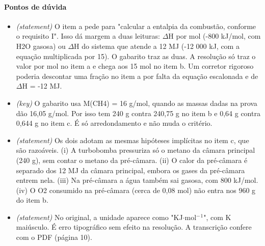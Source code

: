 \documentclass{article}%
\begin{document}
\paragraph{Pontos de dúvida}%
\begin{itemize}%
\item%
\textit{(statement)} O item a pede para "calcular a entalpia da combustão, conforme o requisito I". Isso dá margem a duas leituras: $\Delta$H por mol (-800 kJ/mol, com H2O gasosa) ou $\Delta$H do sistema que atende a 12 MJ (-12 000 kJ, com a equação multiplicada por 15). O gabarito traz as duas. A resolução só traz o valor por mol no item a e chega aos 15 mol no item b. Um corretor rigoroso poderia descontar uma fração no item a por falta da equação escalonada e de $\Delta$H = -12 MJ.%
\item%
\textit{(key)} O gabarito usa M(CH4) = 16 g/mol, quando as massas dadas na prova dão 16,05 g/mol. Por isso tem 240 g contra 240,75 g no item b e 0,64 g contra 0,644 g no item c. É só arredondamento e não muda o critério.%
\item%
\textit{(statement)} Os dois adotam as mesmas hipóteses implícitas no item c, que são razoáveis. (i) A turbobomba pressuriza só o metano da câmara principal (240 g), sem contar o metano da pré{-}câmara. (ii) O calor da pré{-}câmara é separado dos 12 MJ da câmara principal, embora os gases da pré{-}câmara entrem nela. (iii) Na pré{-}câmara a água também sai gasosa, com 800 kJ/mol. (iv) O O2 consumido na pré{-}câmara (cerca de 0,08 mol) não entra nos 960 g do item b.%
\item%
\textit{(statement)} No original, a unidade aparece como "KJ$\cdot$mol$^{-}$$^{1}$", com K maiúsculo. É erro tipográfico sem efeito na resolução. A transcrição confere com o PDF (página 10).%
\end{itemize}%
\end{document}
